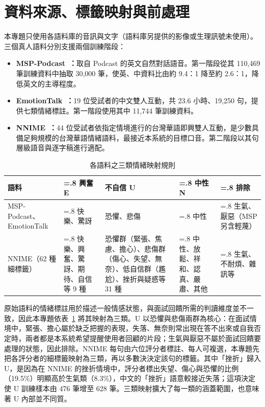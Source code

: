 \section{資料來源、標籤映射與前處理}
\label{sec:data}

本專題只使用各語料庫的音訊與文字（語料庫另提供的影像或生理訊號未使用）。三個真人語料分別支援兩個訓練階段：

\begin{itemize}
  \item \textbf{MSP-Podcast~\cite{msp}：}取自 Podcast 的英文自然對話語音。第一階段從其 110,469 筆訓練資料中抽取 30,000 筆，使英、中資料比由約 9.4：1 降至約 2.6：1，降低英文的主導程度。
  \item \textbf{EmotionTalk~\cite{emotiontalk}：}19 位受試者的中文雙人互動，共 23.6 小時、19,250 句，提供七類情緒標註。第一階段使用其中 11,744 筆訓練資料。
  \item \textbf{NNIME~\cite{nnime}：}44 位受試者依指定情境進行的台灣華語即興雙人互動，是少數具備足夠規模的台灣華語情緒語料，最接近本系統的目標口音。第二階段以其句層級語音與逐字稿進行適配。
\end{itemize}

\begin{table}[!htb]
\centering
\caption{各語料之三類情緒映射規則}
\label{tab:mapping}
\small\setlength{\tabcolsep}{5pt}
\begin{tabularx}{\textwidth}{@{}>{\raggedright\arraybackslash}p{2.75cm}>{\raggedright\arraybackslash\hsize=.8\hsize}X>{\raggedright\arraybackslash\hsize=1.6\hsize}X>{\raggedright\arraybackslash\hsize=.8\hsize}X>{\raggedright\arraybackslash\hsize=.8\hsize}X@{}}
\toprule
語料 & 興奮 E & 不自信 U & 中性 N & 排除\\
\midrule
MSP-Podcast、\newline EmotionTalk & 快樂、驚訝 & 恐懼、悲傷 & 中性 & 生氣、厭惡（MSP 另含輕蔑）\\
NNIME\newline（62 種細標籤） & 快樂、興奮、驚訝、期待、自信等 9 種 & 恐懼群（緊張、焦慮、擔心）、悲傷群（傷心、失望、無奈）、低自信群（尷尬）、挫折與疑惑等 31 種 & 中性、放鬆、祥和、認真、嚴肅、其他 & 生氣、不耐煩、雜訊等\\
\bottomrule
\end{tabularx}
\end{table}

原始語料的情緒標註用於描述一般情感狀態，與面試回饋所需的判讀維度並不一致，因此本專題依表~\ref{tab:mapping} 將其映射為三類。U 以恐懼與悲傷兩群為核心：在面試情境中，緊張、擔心屬於缺乏把握的表現，失落、無奈則常出現在答不出來或自我否定時，兩者都是本系統希望提醒使用者回顧的片段；生氣與厭惡不屬於面試回饋要處理的狀態，因此排除。NNIME 每句由六位評分者標註、每人可複選，本專題先把各評分者的細標籤映射為三類，再以多數決決定該句的標籤。其中「挫折」歸入 U，是因為在 NNIME 的挫折情境中，評分者標出失望、傷心與恐懼的比例（19.5\%）明顯高於生氣類（8.3\%），中文的「挫折」語意較接近失落；這項決定使 U 訓練樣本由 476 筆增至 628 筆。三類映射擴大了每一類的涵蓋範圍，也意味著 U 內部並不同質。

